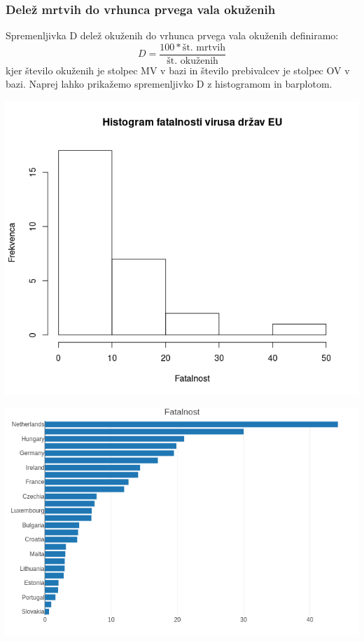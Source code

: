 \documentclass[a4paper,11pt]{article}
\begin{document}
\subsubsection{Delež mrtvih do vrhunca prvega vala okuženih}
Spremenljivka D delež okuženih do vrhunca prvega vala okuženih definiramo:
\[D = \frac{100 * \text{št. mrtvih}}{\text{št. okuženih}}\]
kjer število okuženih je stolpec MV v bazi in število prebivalcev je stolpec OV v bazi. Naprej lahko prikažemo spremenljivko D z histogramom in barplotom.\\
\begin{center}
\includegraphics[scale=0.6]{histogram_fatalnost}\\
\end{center}
\begin{center}
\includegraphics[scale=0.6]{barplot_fatalnost}\\
\end{center}
\end{document}
